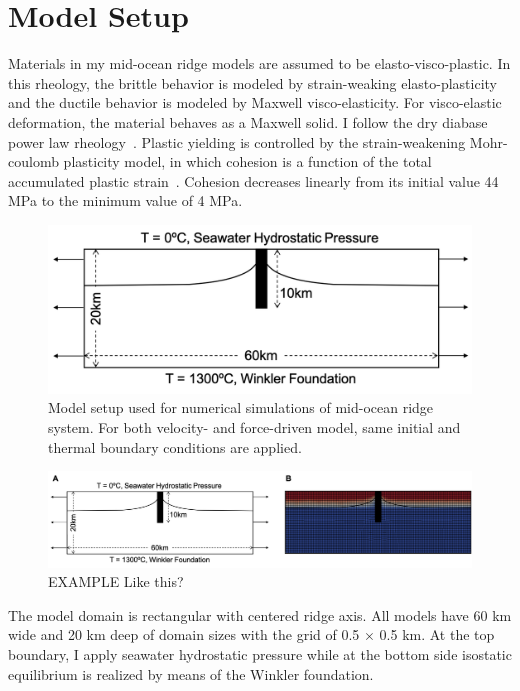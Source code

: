 \documentclass[letterpaper,12pt,notitle]{memphisthesis}                     %
\begin{document}
\section{Model Setup}
Materials in my mid-ocean ridge models are assumed to be elasto-visco-plastic. In this rheology, the brittle behavior is modeled by strain-weaking elasto-plasticity and the ductile behavior is modeled by Maxwell visco-elasticity. For visco-elastic deformation, the material behaves as a Maxwell solid. I follow the dry diabase power law rheology~\citep{Kirby1987, Chen1990}. Plastic yielding is controlled by the strain-weakening Mohr-coulomb plasticity model, in which cohesion is a function of the total accumulated plastic strain~\citep{Poliakov1998}. Cohesion decreases linearly from its initial value 44 MPa to the minimum value of 4 MPa.
%
\begin{figure}[!htb]
	\centering
	\includegraphics[width=0.8\linewidth]{./figs/modelsetup.png}
	\caption{Model setup used for numerical simulations of mid-ocean ridge system. For both velocity- and force-driven model, same initial and thermal boundary conditions are applied.}
	\label{fig:modelsetup}
\end{figure}
%
\begin{figure}[!htb]
	\centering
	\includegraphics[width=0.9\linewidth]{./figs/modelsetup1.png}
	\caption{EXAMPLE Like this?}
	\label{fig:mesh}
\end{figure}

The model domain is rectangular with centered ridge axis. All models have 60 km wide and 20 km deep of domain sizes with the grid of 0.5 $\times$ 0.5 km. At the top boundary, I apply seawater hydrostatic pressure while at the bottom side isostatic equilibrium is realized by means of the Winkler foundation.  
\end{document}
